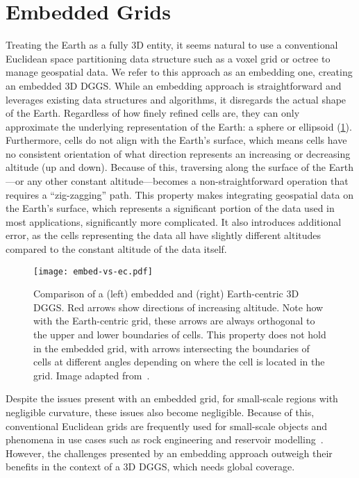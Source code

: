 \section{Embedded Grids} \label{chap:3:embedded}
Treating the Earth as a fully 3D entity, it seems natural to use a conventional Euclidean space partitioning data structure such as a voxel grid or octree to manage geospatial data.
We refer to this approach as an embedding one, creating an embedded 3D DGGS.
While an embedding approach is straightforward and leverages existing data structures and algorithms, it disregards the actual shape of the Earth.
Regardless of how finely refined cells are, they can only approximate the underlying representation of the Earth: a sphere or ellipsoid (\cref{fig:embedded}).
Furthermore, cells do not align with the Earth's surface, which means cells have no consistent orientation of what direction represents an increasing or decreasing altitude (up and down).
Because of this, traversing along the surface of the Earth---or any other constant altitude---becomes a non-straightforward operation that requires a ``zig-zagging'' path.
This property makes integrating geospatial data on the Earth's surface, which represents a significant portion of the data used in most applications, significantly more complicated.
It also introduces additional error, as the cells representing the data all have slightly different altitudes compared to the constant altitude of the data itself.


\begin{figure}[ht!]
	\centering
	\texttt{[image: embed-vs-ec.pdf]}
	\caption[Comparison of embedded and Earth-centric approaches for a 3D DGGS]{
		Comparison of a (left) embedded and (right) Earth-centric 3D DGGS.
		Red arrows show directions of increasing altitude.
		Note how with the Earth-centric grid, these arrows are always orthogonal to the upper and lower boundaries of cells.
		This property does not hold in the embedded grid, with arrows intersecting the boundaries of cells at different angles depending on where the cell is located in the grid.
		Image adapted from~\cite{yu2012large-scale}.
	}
	\label{fig:embedded}
\end{figure}


Despite the issues present with an embedded grid, for small-scale regions with negligible curvature, these issues also become negligible.
Because of this, conventional Euclidean grids are frequently used for small-scale objects and phenomena in use cases such as rock engineering and reservoir modelling~\cite{jing2003review}.
However, the challenges presented by an embedding approach outweigh their benefits in the context of a 3D DGGS, which needs global coverage.


